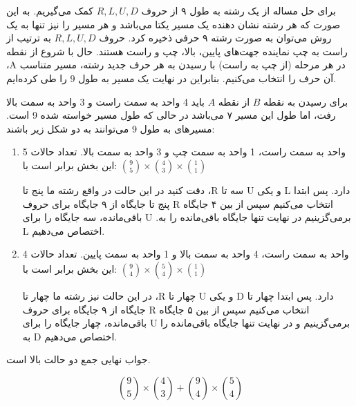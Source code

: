 \p
برای حل مساله از یک رشته به طول ۹ از حروف
$R, L, U, D$
کمک می‌گیریم.
به این صورت که هر رشته نشان دهنده یک مسیر یکتا می‌باشد و هر مسیر را نیز تنها به یک روش می‌توان به صورت رشته ۹ حرفی ذخیره کرد.
حروف 
$R, L, U, D$
به ترتیب از راست به چپ نماینده جهت‌های پایین، بالا، چپ و راست هستند.
حال با شروع از نقطه 
،A
در هر مرحله (از چپ به راست) با رسیدن به هر
حرف جدید رشته، مسیر متناسب آن حرف را انتخاب می‌کنیم. بنابراین در نهایت یک مسیر به طول
 $9$
 را طی کرده‌ایم.


\p
برای رسیدن به نقطه $B$ از نقطه $A$ 
باید 4 واحد به سمت راست و 3 واحد به سمت بالا رفت، اما طول این مسیر ۷ می‌باشد
در حالی که طول مسیر خواسته شده 9 است. مسیر‌های به طول 9 می‌توانند به دو شکل زیر باشند:

\begin{enumerate}
\item
5 واحد به سمت راست، 1 واحد به سمت چپ و 3 واحد به سمت بالا.
تعداد حالات این بخش برابر است با:
$\binom{9}{5} \times \binom{4}{3} \times \binom{1}{1}$

دقت کنید در این حالت در واقع رشته ما پنج تا ،R سه تا U و یکی L دارد.
پس 
ابتدا
پنج تا جایگاه از ۹ جایگاه برای حروف R انتخاب می‌کنیم
سپس از بین ۴ جایگاه باقی‌مانده، سه جایگاه را برای U .برمی‌گزینیم
 در نهایت تنها جایگاه باقی‌مانده را به L اختصاص می‌دهیم.

\item
4 واحد به سمت راست، 4 واحد به سمت بالا و 1 واحد به سمت پایین.
تعداد حالات این بخش برابر است با:
$\binom{9}{4} \times \binom{5}{4} \times \binom{1}{1}$


در این حالت نیز رشته ما چهار تا ،R چهار تا U و یکی D دارد.
پس 
ابتدا
چهار تا جایگاه از ۹ جایگاه برای حروف R انتخاب می‌کنیم
سپس از بین ۵ جایگاه باقی‌مانده، چهار جایگاه را برای U برمی‌گزینیم
و در نهایت تنها جایگاه باقی‌مانده را به D اختصاص می‌دهیم.
\end{enumerate}


\p
جواب نهایی جمع دو حالت بالا است.

$$\binom{9}{5} \times \binom{4}{3} + \binom{9}{4} \times \binom{5}{4}$$